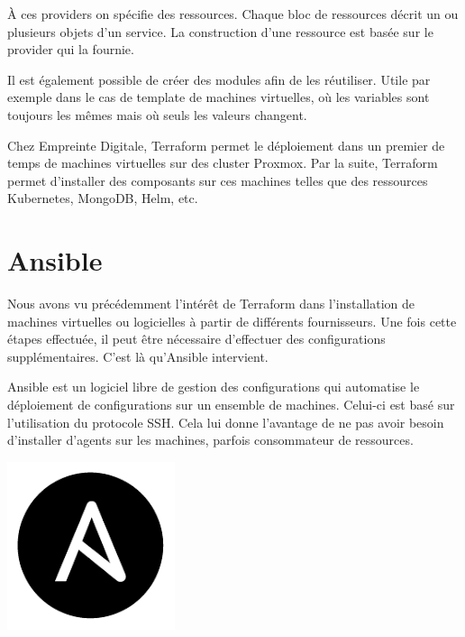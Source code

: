 \documentclass[12pt]{article}
\begin{document}
À ces providers on spécifie des ressources. 
Chaque bloc de ressources décrit un ou plusieurs objets d'un service. 
La construction d'une ressource est basée sur le provider qui la fournie.

Il est également possible de créer des modules afin de les réutiliser. 
Utile par exemple dans le cas de template de machines virtuelles, où les variables sont toujours les mêmes mais où seuls les valeurs changent.

Chez Empreinte Digitale, \gls{Terraform} permet le déploiement dans un premier de temps de machines virtuelles sur des \gls{cluster} \gls{Proxmox}. 
Par la suite, \gls{Terraform} permet d'installer des composants sur ces machines telles que des ressources Kubernetes, MongoDB, Helm, etc.

\newpage
\section{Ansible}
Nous avons vu précédemment l'intérêt de \gls{Terraform} dans l'installation de machines virtuelles ou logicielles à partir de différents fournisseurs. 
Une fois cette étapes effectuée, il peut être nécessaire d'effectuer des configurations supplémentaires. 
C'est là qu'\gls{Ansible} intervient.

\noindent%
\begin{minipage}{.8\textwidth}%
\gls{Ansible} est un logiciel libre de gestion des configurations qui automatise le déploiement de configurations sur un ensemble de machines. 
Celui-ci est basé sur l'utilisation du protocole SSH. 
Cela lui donne l'avantage de ne pas avoir besoin d'installer d'agents sur les machines, parfois consommateur de ressources.

\end{minipage}%
\hfill
\begin{minipage}{.2\textwidth}%
\begin{center}
\includegraphics[scale=0.3]{src/logo_ansible.png}
\end{center}
\end{minipage}%
\end{document}
